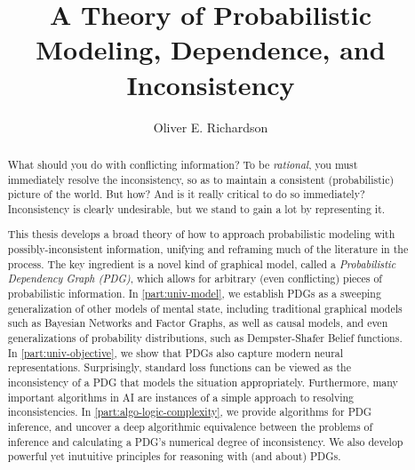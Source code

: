 \documentclass[tocprelim,
    ]{cornellmodified}
\title {%
    A Theory of Probabilistic Modeling, 
        Dependence, and Inconsistency
}
\author {Oliver E. Richardson}
\begin{document}
\maketitle
\makecopyright

\begin{abstract}
%

What should you do with conflicting information?
To be \emph{rational}, you must immediately resolve the inconsistency,
    so as to maintain a consistent (probabilistic) picture of the world.
%
But how?
And is it really critical to do so immediately?
Inconsistency is clearly undesirable, but we stand to gain a lot by representing it.
%

This thesis develops a broad theory of how to approach probabilistic modeling with possibly-inconsistent information, unifying and reframing much of the literature in the process.  
The key ingredient is a novel kind of graphical model, called a \emph{Probabilistic Dependency Graph (PDG)},
which allows for arbitrary (even conflicting) pieces of probabilistic information. 
In \cref{part:univ-model}, we establish PDGs as a sweeping generalization of other models of mental state, including traditional graphical models such as Bayesian Networks and Factor Graphs, as well as causal models, and even generalizations of probability distributions, such as Dempster-Shafer Belief functions. 
In \cref{part:univ-objective}, we show that PDGs also capture modern neural representations.
Surprisingly, standard loss functions can be viewed as the inconsistency of a PDG that models the situation appropriately. 
Furthermore, many important algorithms in AI are instances of a simple approach to resolving inconsistencies. 
In \cref{part:algo-logic-complexity}, we provide algorithms for PDG inference, and uncover a deep algorithmic equivalence between the problems of inference and calculating a PDG's numerical degree of inconsistency. 
We also develop powerful yet inutuitive principles for reasoning with (and about) PDGs. 
\end{abstract}
\end{document}
